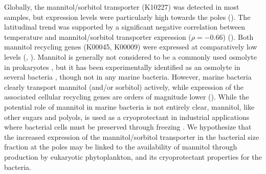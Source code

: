 \documentclass[utf8]{frontiersSCNS} %
\begin{document}
Globally, the mannitol/sorbitol transporter (K10227) was detected in most samples, but expression levels were particularly high towards the poles (). The latitudinal trend was supported by a significant negative correlation between temperature and mannitol/sorbitol transporter expression ($\rho=-0.66$) (). Both mannitol recycling genes (K00045, K00009) were expressed at comparatively low levels (, ). Mannitol is generally not considered to be a commonly used osmolyte in prokaryotes \citep{Empadinhas2008}, but it has been experimentally identified as an osmolyte in several bacteria \citep{Kets1996,Zahid2015}, though not in any marine bacteria. However, marine bacteria clearly transport mannitol (and/or sorbitol) actively, while expression of the associated cellular recycling genes are orders of magnitude lower (). While the potential role of mannitol in marine bacteria is not entirely clear, mannitol, like other sugars and polyols, is used as a cryoprotectant in industrial applications where bacterial cells must be preserved through freezing \citep{Savini2010}. We hypothesize that the increased expression of the mannitol/sorbitol transporter in the bacterial size fraction at the poles may be linked to the availability of mannitol through production by eukaryotic phytoplankton, and its cryoprotectant properties for the bacteria. 
\end{document}
